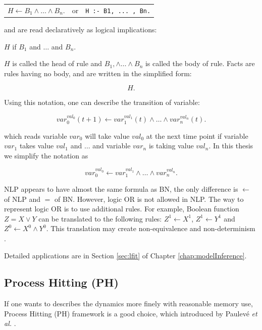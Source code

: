 \begin{table}[ht]
    \centering
    \begin{tabular}{ccc}
        $H \gets B_1\land\ldots\land B_n.$  & or & \texttt{H :- B1, ... , Bn.}
    \end{tabular}
\end{table}

and are read declaratively as logical implications:

\begin{center}
    $H$ if $B_1$ and $\ldots$ and $B_n$.
\end{center}

$H$ is called the head of rule and $B_1,\land\ldots\land B_n$ is called the body of rule.
Facts are rules having no body, and are written in the simplified form:

$$H.$$

Using this notation, one can describe the transition of variable:

    $$var_0^{val_0}(t+1) \gets var_1^{val_1}(t)\land \ldots \land var_n^{val_n}(t).$$
    
which reads variable $var_0$ will take value $val_0$ at the next time point if variable $var_1$ takes value $val_1$ and $\ldots$ and variable $var_n$ is taking value $val_n$.
In this thesis we simplify the notation as 

$$var_0^{val_0} \gets var_1^{val_1}\land \ldots \land var_n^{val_n}.$$

\begin{remark}
NLP appears to have almost the same formula as BN, the only difference is $\gets$ of NLP and $=$ of BN.
However, logic OR is not allowed in NLP.
The way to represent logic OR is to use additional rules.
For example, Boolean function $Z=X\lor Y$ can be translated to the following rules: $Z^1\gets X^1$, $Z^1\gets Y^1$ and $Z^0\gets X^0\land Y^0$.
This translation may create non-equivalence and non-determinism \cite{inoue2011logic}.
\end{remark}

Detailed applications are in Section \ref{sec:lfit} of Chapter \ref{chap:modelInference}.

\subsection{Process Hitting (PH)}
If one wants to describes the dynamics more finely with reasonable memory use, Process Hitting (PH) framework is a good choice, which introduced by Paulev\'e \textit{et al.} \cite{pauleve2011}.

